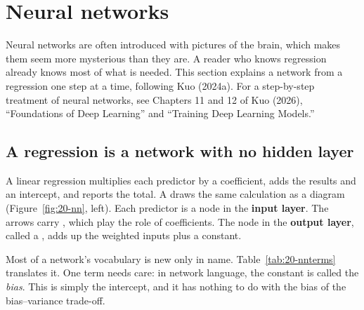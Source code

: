 \section{Neural networks}
\label{sec:20-nn}

Neural networks are often introduced with pictures of the brain, which makes them seem more mysterious than they are. A reader who knows regression already knows most of what is needed. This section explains a network from a regression one step at a time, following Kuo (2024a). For a step-by-step treatment of neural networks, see Chapters 11 and 12 of Kuo (2026), ``Foundations of Deep Learning'' and ``Training Deep Learning Models.''

\subsection{A regression is a network with no hidden layer}

A linear regression multiplies each predictor by a coefficient, adds the results and an intercept, and reports the total. A  draws the same calculation as a diagram (Figure~\ref{fig:20-nn}, left). Each predictor is a node in the \textbf{input layer}. The arrows carry , which play the role of coefficients. The node in the \textbf{output layer}, called a , adds up the weighted inputs plus a constant.

Most of a network's vocabulary is new only in name. Table~\ref{tab:20-nnterms} translates it. One term needs care: in network language, the constant is called the \emph{bias}. This is simply the intercept, and it has nothing to do with the bias of the bias--variance trade-off.

